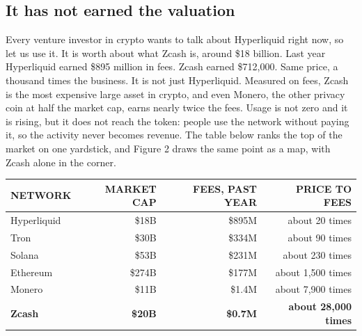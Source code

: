 \documentclass[11pt]{article}
\begin{document}
\subsection{It has not earned the valuation}
Every venture investor in crypto wants to talk about Hyperliquid right now, so let us use it. It is worth about what Zcash is, around \$18 billion. Last year Hyperliquid earned \$895 million in fees. Zcash earned \$712,000. Same price, a thousand times the business. It is not just Hyperliquid. Measured on fees, Zcash is the most expensive large asset in crypto, and even Monero, the other privacy coin at half the market cap, earns nearly twice the fees. Usage is not zero and it is rising, but it does not reach the token: people use the network without paying it, so the activity never becomes revenue. The table below ranks the top of the market on one yardstick, and Figure 2 draws the same point as a map, with Zcash alone in the corner.

\vspace{2pt}
\begin{center}
\begin{tabular}{@{}lrrr@{}}
\toprule
{\sffamily\footnotesize\color{mid}NETWORK} & {\sffamily\footnotesize\color{mid}MARKET CAP} & {\sffamily\footnotesize\color{mid}FEES, PAST YEAR} & {\sffamily\footnotesize\color{mid}PRICE TO FEES} \\
\midrule
Hyperliquid & \$18B & \$895M & about 20 times \\
Tron & \$30B & \$334M & about 90 times \\
Solana & \$53B & \$231M & about 230 times \\
Ethereum & \$274B & \$177M & about 1,500 times \\
Monero & \$11B & \$1.4M & about 7,900 times \\
\textbf{Zcash} & \textbf{\$20B} & \textbf{\$0.7M} & \textbf{about 28,000 times} \\
\bottomrule
\end{tabular}
\end{center}
\end{document}
